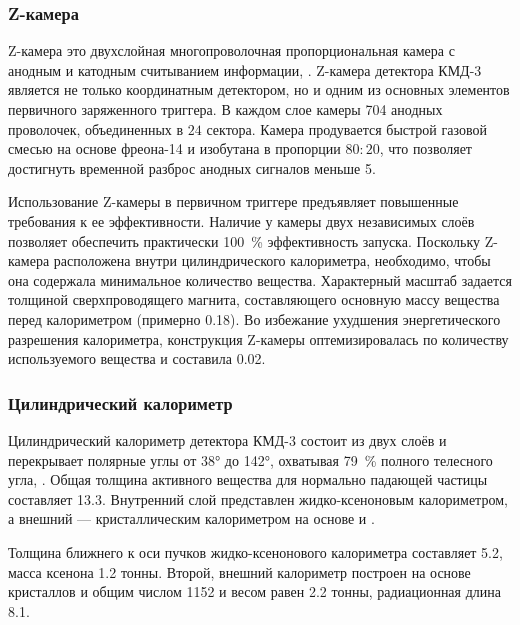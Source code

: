 \subsubsection{Z-камера}

Z-камера это двухслойная многопроволочная пропорциональная камера с анодным и катодным считыванием информации, \cite{Anashkin1992}.
Z-камера детектора КМД-3 является не только координатным детектором,
но и одним из основных элементов первичного заряженного триггера.
В каждом слое камеры \num{704} анодных проволочек, объединенных в $24$ сектора.
Камера продувается быстрой газовой смесью на основе фреона-14  и изобутана  в пропорции $80:20$,
что позволяет достигнуть временной разброс анодных сигналов меньше \SI{5}{\nsr}.

Использование Z-камеры в первичном триггере предъявляет повышенные требования к ее эффективности.
Наличие у камеры двух независимых слоёв позволяет обеспечить практически \SI{100}{\percent} эффективность запуска.
Поскольку Z-камера расположена внутри цилиндрического калориметра, необходимо, чтобы она содержала минимальное количество вещества.
Характерный масштаб задается толщиной сверхпроводящего магнита, составляющего основную массу вещества перед калориметром (примерно \SI{0.18}{\Xrad}).
Во избежание ухудшения энергетического разрешения калориметра,
конструкция Z-камеры оптемизировалась по количеству используемого вещества и составила \SI{0.02}{\Xrad}.


\subsubsection{Цилиндрический калориметр}
\label{sel:barrel_calorimeter}

Цилиндрический калориметр детектора КМД-3 состоит из двух слоёв и перекрывает полярные углы от \ang{38} до \ang{142},
охватывая \SI{79}{\percent} полного телесного угла,
\cite{BarrelCalCMD3Anisenkov:2013yva}.
Общая толщина активного вещества для нормально падающей частицы составляет \SI{13.3}{\Xrad}.
Внутренний слой представлен жидко-ксеноновым калориметром,
а внешний
---
кристаллическим калориметром на основе  и .

Толщина ближнего к оси пучков жидко-ксенонового калориметра составляет \SI{5.2}{\Xrad},
масса ксенона \num{1.2} тонны. 
Второй,
внешний калориметр построен на основе кристаллов  и  общим числом \num{1152} и весом равен \num{2.2} тонны, 
радиационная длина \SI{8.1}{\Xrad}.

